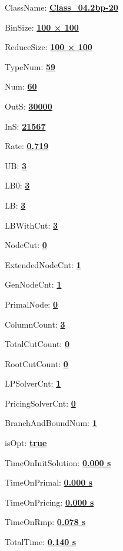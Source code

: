 \documentclass[11pt]{article}
\begin{document}
\pagestyle{empty}


ClassName: \underline{\textbf{Class_04.2bp-20}}
\par
BinSize: \underline{\textbf{100 × 100}}
\par
ReduceSize: \underline{\textbf{100 × 100}}
\par
TypeNum: \underline{\textbf{59}}
\par
Num: \underline{\textbf{60}}
\par
OutS: \underline{\textbf{30000}}
\par
InS: \underline{\textbf{21567}}
\par
Rate: \underline{\textbf{0.719}}
\par
UB: \underline{\textbf{3}}
\par
LB0: \underline{\textbf{3}}
\par
LB: \underline{\textbf{3}}
\par
LBWithCut: \underline{\textbf{3}}
\par
NodeCut: \underline{\textbf{0}}
\par
ExtendedNodeCnt: \underline{\textbf{1}}
\par
GenNodeCnt: \underline{\textbf{1}}
\par
PrimalNode: \underline{\textbf{0}}
\par
ColumnCount: \underline{\textbf{3}}
\par
TotalCutCount: \underline{\textbf{0}}
\par
RootCutCount: \underline{\textbf{0}}
\par
LPSolverCnt: \underline{\textbf{1}}
\par
PricingSolverCnt: \underline{\textbf{0}}
\par
BranchAndBoundNum: \underline{\textbf{1}}
\par
isOpt: \underline{\textbf{true}}
\par
TimeOnInitSolution: \underline{\textbf{0.000 s}}
\par
TimeOnPrimal: \underline{\textbf{0.000 s}}
\par
TimeOnPricing: \underline{\textbf{0.000 s}}
\par
TimeOnRmp: \underline{\textbf{0.078 s}}
\par
TotalTime: \underline{\textbf{0.140 s}}
\par
\newpage
\end{document}
